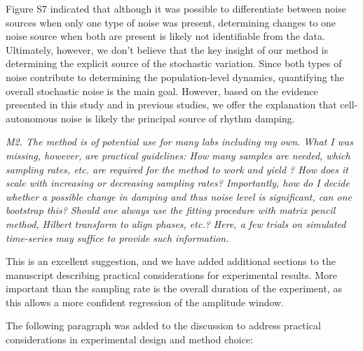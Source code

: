 \documentclass[11pt, letterpaper]{article}
\newenvironment{reviewer}{\itshape\color{gray}}{}
\begin{document}
Figure S7 indicated that although it was possible to differentiate between noise sources when only one type of noise was present, determining changes to one noise source when both are present is likely not identifiable from the data.
Ultimately, however, we don't believe that the key insight of our method is determining the explicit source of the stochastic variation.
Since both types of noise contribute to determining the population-level dynamics, quantifying the overall stochastic noise is the main goal.
However, based on the evidence presented in this study and in previous studies, we offer the explanation that cell-autonomous noise is likely the principal source of rhythm damping.

\begin{reviewer}
M2. The method is of potential use for many labs including my own. What I was missing, however, are practical guidelines: How many samples are needed, which sampling rates, etc. are required for the method to work and yield ? How does it scale with increasing or decreasing sampling rates? Importantly, how do I decide whether a possible change in damping and thus noise level is significant, can one bootstrap this? Should one always use the fitting procedure with matrix pencil method, Hilbert transform to align phases, etc.? Here, a few trials on simulated time-series may suffice to provide such information.
\end{reviewer}

This is an excellent suggestion, and we have added additional sections to the manuscript describing practical considerations for experimental results.
More important than the sampling rate is the overall duration of the experiment, as this allows a more confident regression of the amplitude window.

The following paragraph was added to the discussion to address practical considerations in experimental design and method choice:
\end{document}
